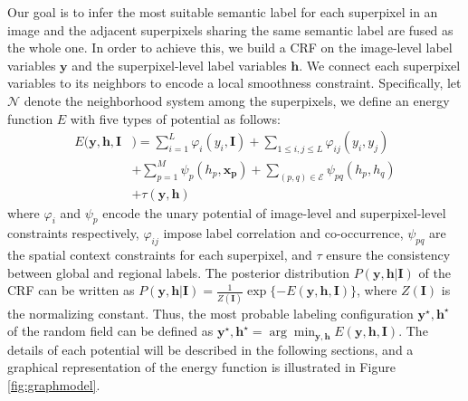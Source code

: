 Our goal is to infer the most suitable semantic label for each superpixel in an image and the adjacent superpixels sharing the same semantic label are fused as the whole one.
In order to achieve this, we build a CRF on the image-level label variables $\boldsymbol{y}$ and the superpixel-level label variables $\boldsymbol{h}$.
We connect each superpixel variables to its neighbors to encode a local smoothness constraint.
Specifically, let $\mathcal{N}$ denote the neighborhood system among the superpixels, we define an energy function $E$ with five types of potential as follows:
\begin{equation}
    \label{eq:energyfunction}
    \begin{aligned}
        E(\boldsymbol{y},\boldsymbol{h},\boldsymbol{I}&) = \sum_{i=1}^L{\varphi_{i}(y_i,\boldsymbol{I})}
                            + \sum_{1 \le i,j \le L} {\varphi_{ij}(y_i,y_j)}\\ &+ \sum_{p=1}^M{\psi_{p}(h_p,\boldsymbol{x_p})}+ \sum_{(p,q) \in \mathcal{E}}{\psi_{pq}(h_p,h_q)}\\ &+ \tau (\boldsymbol{y},\boldsymbol{h})
    \end{aligned}
\end{equation}
where $\varphi_{i}$ and $\psi_{p}$ encode the unary potential of image-level and superpixel-level constraints respectively, $\varphi_{ij}$ impose label correlation and co-occurrence, $\psi_{pq}$ are the spatial context constraints for each superpixel, and $\tau$ ensure the consistency between global and regional labels.
The posterior distribution $P(\boldsymbol{y},\boldsymbol{h}|\boldsymbol{I})$ of the CRF can be written as $P(\boldsymbol{y},\boldsymbol{h}|\boldsymbol{I}) = \frac{1}{Z(\boldsymbol{I})}\exp{\{-E(\boldsymbol{y},\boldsymbol{h},\boldsymbol{I})\}}$, where $Z(\boldsymbol{I})$ is the normalizing constant.
Thus, the most probable labeling configuration $\boldsymbol{y}^{\star},\boldsymbol{h}^{\star}$ of the random field can be defined as  $\boldsymbol{y}^{\star},\boldsymbol{h}^{\star} = \arg \min_{\boldsymbol{y},\boldsymbol{h}} E(\boldsymbol{y},\boldsymbol{h},\boldsymbol{I})$.
The details of each potential will be described in the following sections, and a graphical representation of the energy function is illustrated in Figure \ref{fig:graphmodel}.


